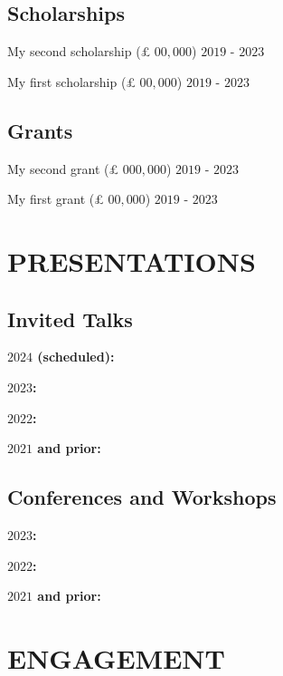 \documentclass[11pt,]{article}
\providecommand{\tightlist}{%
  \setlength{\itemsep}{0pt}\setlength{\parskip}{0pt}}
\renewenvironment{itemize}{
  \begin{list}{}{
    \setlength{\leftmargin}{1.5em}
  }
}{
  \end{list}
}
\begin{document}
\subsection{Scholarships}\label{scholarships}

\begin{itemize}
\tightlist
\item
  My second scholarship (£ \(00,000\)) \hfill \(2019\) - \(2023\)
\item
  My first scholarship (£ \(00,000\)) \hfill \(2019\) - \(2023\)
\end{itemize}

\subsection{Grants}\label{grants}

\begin{itemize}
\tightlist
\item
  My second grant (£ \(000,000\)) \hfill \(2019\) - \(2023\)
\item
  My first grant (£ \(00,000\)) \hfill \(2019\) - \(2023\)
\end{itemize}

\section{PRESENTATIONS}\label{presentations}

\subsection{Invited Talks}\label{invited-talks}

\textbf{\(2024\) (scheduled):}

\textbf{\(2023\):}

\textbf{\(2022\):}

\textbf{\(2021\) and prior:}

\subsection{Conferences and Workshops}\label{conferences-and-workshops}

\textbf{\(2023\):}

\textbf{\(2022\):}

\textbf{\(2021\) and prior:}

\section{ENGAGEMENT}\label{engagement}
\end{document}
